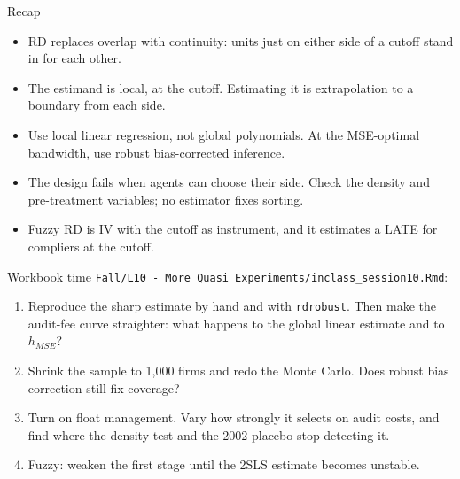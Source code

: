 \documentclass[aspectratio=169,11pt]{beamer}
\begin{document}
\begin{frame}{Recap}
\begin{itemize}
	\item RD replaces overlap with continuity: units just on either side of a cutoff stand in for each other.
	\medskip
	\item The estimand is local, at the cutoff. Estimating it is extrapolation to a boundary from each side.
	\medskip
	\item Use local linear regression, not global polynomials. At the MSE-optimal bandwidth, use robust
	bias-corrected inference.
	\medskip
	\item The design fails when agents can choose their side. Check the density and pre-treatment variables;
	no estimator fixes sorting.
	\medskip
	\item Fuzzy RD is IV with the cutoff as instrument, and it estimates a LATE for compliers at the cutoff.
\end{itemize}
\end{frame}


\begin{frame}{Workbook time}
\texttt{Fall/L10 - More Quasi Experiments/inclass\_session10.Rmd}:
\begin{enumerate}
	\item Reproduce the sharp estimate by hand and with \texttt{rdrobust}. Then make the audit-fee curve
	straighter: what happens to the global linear estimate and to $h_{MSE}$?
	\item Shrink the sample to 1,000 firms and redo the Monte Carlo. Does robust bias correction still fix coverage?
	\item Turn on float management. Vary how strongly it selects on audit costs, and find where the density
	test and the 2002 placebo stop detecting it.
	\item Fuzzy: weaken the first stage until the 2SLS estimate becomes unstable.
\end{enumerate}
\end{frame}
\end{document}
